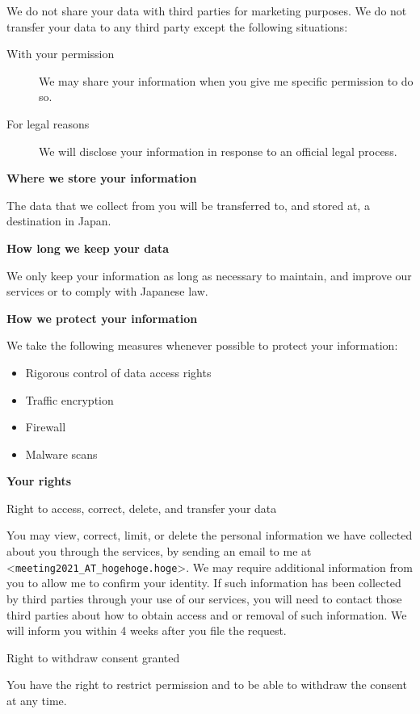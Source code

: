 \documentclass[titlepage,10pt,a4paper,uplatex]{jsbook}
\newenvironment{content}{\begin{shaded}\vspace{-1em}\raggedright\ttfamily\footnotesize\setlength{\baselineskip}{1.4em}}{\end{shaded}\vspace{-1em}}
\renewcommand{\textbf}[1]{{\bfseries\sffamily#1}}
\begin{document}
\begin{content}
We do not share your data with third parties for marketing purposes. We do not transfer your data to any third party except the following situations:

\begin{description}
\item[With your permission] We may share your information when you give me specific permission to do so.
\item[For legal reasons] We will disclose your information in response to an official legal process.
\end{description}

\textbf{\Large Where we store your information}

The data that we collect from you will be transferred to, and stored at, a destination in Japan.

\textbf{\Large How long we keep your data}

We only keep your information as long as necessary to maintain, and improve our services or to comply with Japanese law.

\textbf{\Large How we protect your information}

We take the following measures whenever possible to protect your information:

\begin{itemize}
\item Rigorous control of data access rights
\item Traffic encryption
\item Firewall
\item Malware scans
\end{itemize}

\textbf{\Large Your rights}

{\Large Right to access, correct, delete, and transfer your data}

You may view, correct, limit, or delete the personal information we have collected about you through the services, by sending an email to me at {\textless}\texttt{meeting2021\_AT\_hogehoge.hoge}{\textgreater}. We may require additional information from you to allow me to confirm your identity. If such information has been collected by third parties through your use of our services, you will need to contact those third parties about how to obtain access and or removal of such information. We will inform you within 4 weeks after you file the request.

{\Large Right to withdraw consent granted}

You have the right to restrict permission and to be able to withdraw the consent at any time.


\end{content}
\end{document}
